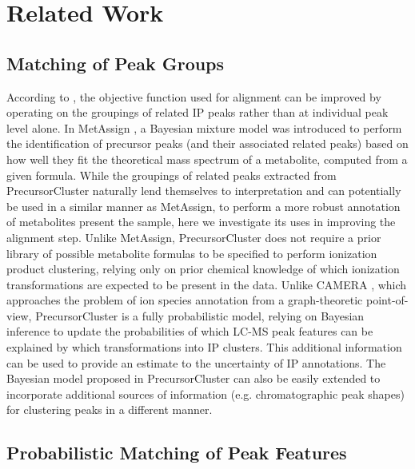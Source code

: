 \section{Related Work}

\subsection{Matching of Peak Groups}

According to \cite{Smith2015}, the objective function used for alignment can be improved by operating on the groupings of related IP peaks rather than at individual peak level alone. In MetAssign \cite{Daly2014}, a Bayesian mixture model was introduced to perform the identification of precursor peaks (and their associated related peaks) based on how well they fit the theoretical mass spectrum of a metabolite, computed from a given formula. While the groupings of related peaks extracted from PrecursorCluster naturally lend themselves to interpretation and can potentially be used in a similar manner as MetAssign, to perform a more robust annotation of metabolites present the sample, here we investigate its uses in improving the alignment step. Unlike MetAssign, PrecursorCluster does not require a prior library of possible metabolite formulas to be specified to perform ionization product clustering, relying only on prior chemical knowledge of which ionization transformations are expected to be present in the data. Unlike CAMERA \cite{Kuhl2012}, which approaches the problem of ion species annotation from a graph-theoretic point-of-view, PrecursorCluster is a fully probabilistic model, relying on Bayesian inference to update the probabilities of which LC-MS peak features can be explained by which transformations into IP clusters. This additional information can be used to provide an estimate to the uncertainty of IP annotations. The Bayesian model proposed in PrecursorCluster can also be easily extended to incorporate additional sources of information (e.g. chromatographic peak shapes) for clustering peaks in a different manner. 

\subsection{Probabilistic Matching of Peak Features}

